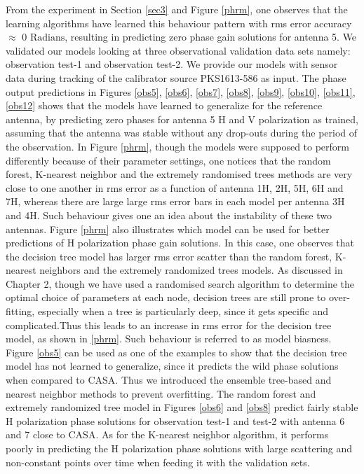 From the experiment in Section \ref{sec3} and Figure \ref{phrm}, one observes that the learning algorithms have learned this behaviour pattern with rms error accuracy $\approx$ 0 $\mathrm{Radians}$, resulting in predicting zero phase gain solutions for antenna 5. We validated our models looking at three observational validation data sets namely: observation test-1 and observation test-2. We provide our models with sensor data during tracking of the calibrator source PKS1613-586 as input. The phase output predictions in Figures \ref{obs5}, \ref{obs6}, \ref{obs7}, \ref{obs8}, \ref{obs9}, \ref{obs10}, \ref{obs11}, \ref{obs12}  shows that the models have learned to generalize for the reference antenna, by predicting zero phases for antenna 5 H and V polarization as trained, assuming that the antenna was stable without any drop-outs during the period of the observation. In Figure \ref{phrm}, though the models were supposed to perform differently because of their parameter settings, one notices that the random forest, K-nearest neighbor and the extremely randomised trees methods are very close to one another in rms error as a function of antenna 1H, 2H, 5H, 6H and 7H, whereas there are large large rms error bars in each model per antenna 3H and 4H. Such behaviour gives one an idea about the instability of these two antennas. Figure \ref{phrm} also illustrates which model can be used for better predictions of H polarization phase gain solutions. In this case, one observes that the decision tree model has larger rms error scatter than the random forest, K-nearest neighbors and the extremely randomized trees models. As discussed in Chapter 2, though we have used a randomised search algorithm to determine the optimal choice of parameters at each node, decision trees are still prone to over-fitting, especially when a tree is particularly deep, since it gets specific and complicated.Thus this leads to an increase in rms error for the decision tree model, as shown in \ref{phrm}. Such behaviour is referred to as model biasness. Figure \ref{obs5} can be used as one of the examples to show that the decision tree model has not learned to generalize, since it predicts the wild phase solutions when compared to CASA. Thus we introduced the ensemble tree-based and nearest neighbor methods to prevent overfitting. The random forest and extremely randomized tree model in Figures \ref{obs6} and \ref{obs8} predict fairly stable H polarization phase solutions for observation test-1 and test-2 with antenna 6 and 7 close to CASA. As for the K-nearest neighbor algorithm, it performs poorly in predicting the H polarization phase solutions with large scattering and non-constant points over time when feeding it with the validation sets. 
  
